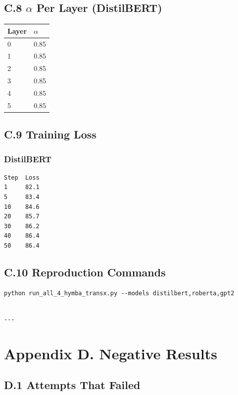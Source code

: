 \subsection{C.8 $\alpha$ Per Layer (DistilBERT)}

\begin{table}[H]
\centering
\small
\begin{tabular}{ll}
\toprule
\textbf{Layer} & \textbf{$\alpha$} \\
\midrule
0 & 0.85 \\
1 & 0.85 \\
2 & 0.85 \\
3 & 0.85 \\
4 & 0.85 \\
5 & 0.85 \\
\bottomrule
\end{tabular}
\end{table}

\subsection{C.9 Training Loss}

\subsubsection{DistilBERT}
\begin{lstlisting}
Step  Loss
1     82.1
5     83.4
10    84.6
20    85.7
30    86.2
40    86.4
50    86.4
\end{lstlisting}

\subsection{C.10 Reproduction Commands}

\begin{lstlisting}
python run_all_4_hymba_transx.py --models distilbert,roberta,gpt2
\end{lstlisting}
\begin{lstlisting}

---
\end{lstlisting}

\section{Appendix D. Negative Results}

\subsection{D.1 Attempts That Failed}

